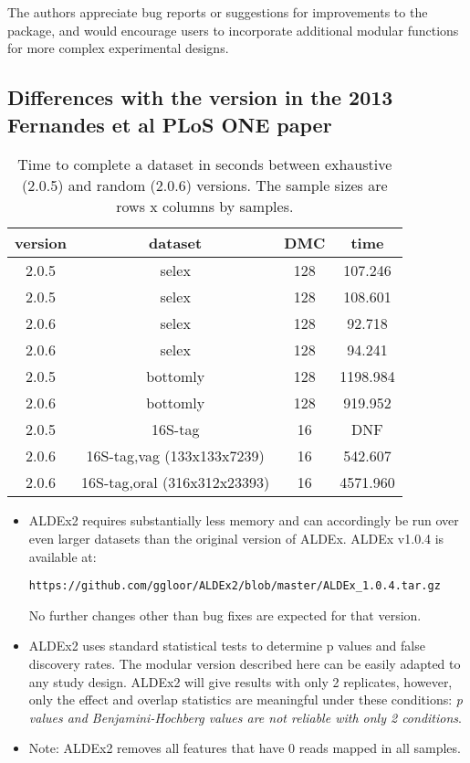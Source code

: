 \documentclass[11pt]{article}
\begin{document}
The authors appreciate bug reports or suggestions for improvements to the package, and would encourage users to incorporate additional modular functions for more complex experimental designs.

\subsection{Differences with the version in the 2013 Fernandes et al PLoS ONE paper}  

\begin{table}
\begin{center}
\caption{Time to complete a dataset in seconds between exhaustive (2.0.5) and random (2.0.6) versions. The sample sizes are rows x columns by samples.}
\begin{tabular}{cccc}

version & dataset & DMC  &  time\\\hline
2.0.5  &  selex  &  128  &  107.246\\
2.0.5  &  selex  &  128  &  108.601\\
2.0.6  &  selex  &  128  &  92.718\\
2.0.6  &  selex  &  128  &  94.241\\
2.0.5  &  bottomly  &  128  &  1198.984   \\
2.0.6  &  bottomly  &  128  &  919.952\\
2.0.5  &  16S-tag  &  16  &  DNF\\
2.0.6  &  16S-tag,vag (133x133x7239)  &  16  &  542.607\\
2.0.6  &  16S-tag,oral (316x312x23393)  &  16  &  4571.960\\
\end{tabular}
\label{exvsra}
\end{center}
\end{table}

\begin{itemize}

\item ALDEx2  requires substantially less memory and can accordingly be run over even larger datasets than the original version of ALDEx. ALDEx v1.0.4 is available at: \begin{verbatim}https://github.com/ggloor/ALDEx2/blob/master/ALDEx_1.0.4.tar.gz\end{verbatim} No further changes other than bug fixes are expected for that version. 

\item ALDEx2 uses standard statistical tests to determine p values and false discovery rates. The modular version described here can be easily adapted to any study design. ALDEx2 will give results with only 2 replicates, however, only the effect and overlap statistics are meaningful under these conditions: \emph{p values and Benjamini-Hochberg values are not reliable with only 2 conditions}.

\item Note: ALDEx2 removes all features that have 0 reads mapped in all samples.
\end{itemize}
\end{document}
